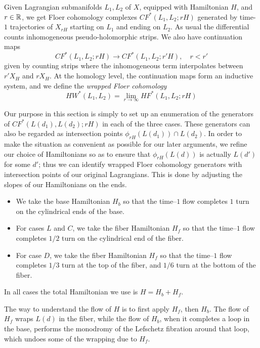 \documentclass[12pt]{amsart}
\begin{document}
Given Lagrangian submanifolds $L_1, L_2$ of $X$, equipped with
Hamiltonian $H$, and $r \in \mathbb{R}$, we get Floer cohomology complexes
$CF^*(L_1,L_2;rH)$ generated by time-$1$ trajectories of
$X_{rH}$ starting on $L_1$ and ending on $L_2$. As usual
the differential counts inhomogeneous pseudo-holomorphic strips. We
also have continuation maps
\begin{equation}
  CF^*(L_1,L_2;rH) \to CF^*(L_1,L_2;r'H), \quad r < r'
\end{equation}
given by counting strips where the inhomogeneous term interpolates
between $r'X_H$ and $rX_H$. At the homology level, the continuation
maps form an inductive system, and we define the \emph{wrapped Floer cohomology}
\begin{equation}
  HW^*(L_1,L_2) = \lim_{r\to \infty} HF^*(L_1,L_2;rH)
\end{equation}

Our purpose in this section is simply to set up an enumeration of
the generators of $CF^*(L(d_1),L(d_2);rH)$ in each of the three
cases. These generators can also be regarded as intersection points
$\phi_{rH}(L(d_1))\cap L(d_2)$. In order to make the situation as
convenient as possible for our later arguments, we refine our choice
of Hamiltonians so as to ensure that $\phi_{rH}(L(d))$ is actually
$L(d')$ for some $d'$; thus we can identify wrapped Floer cohomology
generators with intersection points of our original Lagrangians. This
is done by adjusting the slopes of our Hamiltonians on the ends.
\begin{itemize}
\item We take the base Hamiltonian $H_b$ so that the time--$1$ flow
  completes $1$ turn on the cylindrical ends of the base.
\item For cases $L$ and $C$, we take the fiber Hamiltonian $H_f$ so that the
  time--$1$ flow completes $1/2$ turn on the cylindrical end of the
  fiber.
\item For case $D$, we take the fiber Hamiltonian $H_f$ so that the
  time--$1$ flow completes $1/3$ turn at the top of the fiber, and
  $1/6$ turn at the bottom of the fiber.
\end{itemize}
In all cases the total Hamiltonian we use is $H = H_b + H_f$.

The way to understand the flow of $H$ is to first apply $H_f$, then
$H_b$. The flow of $H_f$ wraps $L(d)$ in the fiber,
while the flow of $H_b$, when it completes a loop in the base,
performs the monodromy of the Lefschetz fibration around that loop,
which undoes some of the wrapping due to $H_f$.
\end{document}
